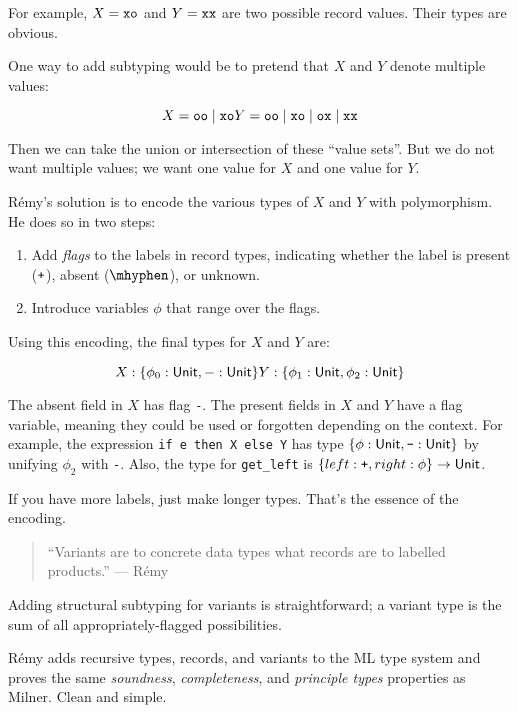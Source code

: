 \documentclass{article}
\begin{document}

For example, $X = {\tt xo}$ and $Y = {\tt xx}$ are two possible record values.
Their types are obvious.

One way to add subtyping would be to pretend that $X$ and $Y$ denote multiple values:

\[
  X = {\tt oo} \mid {\tt xo}
\\
  Y = {\tt oo} \mid {\tt xo} \mid {\tt ox} \mid {\tt xx}
\]

Then we can take the union or intersection of these ``value sets''.
But we do not want multiple values; we want one value for $X$ and one value for $Y$.

R\'{e}my's solution is to encode the various types of $X$ and $Y$ with polymorphism.
He does so in two steps:
\begin{enumerate}
\item
  Add \emph{flags} to the labels in record types, indicating whether the
  label is present ($\texttt{+}$), absent ($\fminus$), or unknown.
\item
  Introduce variables $\phi$ that range over the flags.
\end{enumerate}

Using this encoding, the final types for $X$ and $Y$ are:

\[
  X : \{\phi_0 : \mathsf{Unit}, {\tt -} : \mathsf{Unit}\}
  \\
  Y : \{\phi_1 : \mathsf{Unit}, \phi_2 : \mathsf{Unit}\}
\]

The absent field in $X$ has flag {\tt -}.
The present fields in $X$ and $Y$ have a flag variable, meaning they could be
 used or forgotten depending on the context.
For example, the expression {\tt if e then X else Y} has type $\{\phi : \mathsf{Unit}, \texttt{-} : \mathsf{Unit}\}$
by unifying $\phi_2$ with {\tt -}.
Also, the type for {\tt get\_left} is $\{left : \texttt{+}, right : \phi \} \rightarrow \mathsf{Unit}$.

If you have more labels, just make longer types.
That's the essence of the encoding.

\begin{quote}
  ``Variants are to concrete data types what records are to labelled products.'' --- R\'{e}my
\end{quote}

Adding structural subtyping for variants is straightforward; a variant type is
 the sum of all appropriately-flagged possibilities.

R\'{e}my adds recursive types, records, and variants to the ML type system and
 proves the same \emph{soundness}, \emph{completeness}, and \emph{principle types}
 properties as Milner.
Clean and simple.
\end{document}
